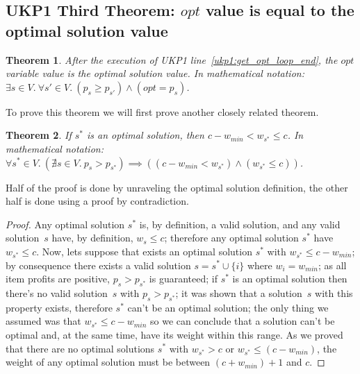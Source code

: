 \documentclass[12pt]{article}
\newtheorem{theorem}{Theorem}
\begin{document}

\subsection{UKP1 Third Theorem: \(opt\) value is equal to the optimal solution value}

\begin{theorem}\label{theo:ukp1:opt_variable}
After the execution of UKP1 line~\ref{ukp1:get_opt_loop_end}, the \(opt\) variable value is the optimal solution value. In mathematical notation: \(\exists s \in V.~\forall s' \in V.~(p_s \geq p_{s'}) \land (opt = p_s)\).
\end{theorem}

\vspace{0.3cm}
\noindent
To prove this theorem we will first prove another closely related theorem.
\vspace{0.2cm}

\begin{theorem}\label{theo:opt_sol_weight_range}
If \(s^*\) is an optimal solution, then \(c - w_{min} < w_{s^*} \leq c\). In mathematical notation: \(\forall s^* \in V.~(\nexists s \in V.~p_s > p_{s^*}) \implies ((c - w_{min} < w_{s^*}) \land (w_{s^*} \leq c))\).
\end{theorem}

\vspace{0.3cm}
\noindent
Half of the proof is done by unraveling the optimal solution definition, the other half is done using a proof by contradiction.
\vspace{0.2cm}

\begin{proof}
Any optimal solution \(s^*\) is, by definition, a valid solution, and any valid solution~\(s\) have, by definition, \(w_s \leq c\); therefore any optimal solution \(s^*\) have \(w_{s^*} \leq c\). Now, lets suppose that exists an optimal solution \(s^*\) with \({w_{s^*} \leq c - w_{min}}\); by consequence there exists a valid solution \(s = s^* \cup \{i\}\) where \(w_i = w_{min}\); as all item profits are positive, \(p_s > p_{s^*}\) is guaranteed; if \(s^*\) is an optimal solution then there's no valid solution~\(s\) with \(p_s > p_{s^*}\); it was shown that a solution~\(s\) with this property exists, therefore \(s^*\) can't be an optimal solution; the only thing we assumed was that \(w_{s^*} \leq c - w_{min}\) so we can conclude that a solution can't be optimal and, at the same time, have its weight within this range. As we proved that there are no optimal solutions \(s^*\) with \(w_{s^*} > c\) or \(w_{s^*} \leq (c - w_{min})\), the weight of any optimal solution must be between \((c + w_{min}) + 1\) and \(c\).
\end{proof}
\end{document}
